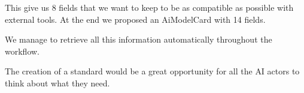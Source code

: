 This give us 8 fields that we want to keep to be as compatible as possible with
external tools. At the end we proposed an \Gls{AiModelCard} with 14 fields.


We manage to retrieve all this information automatically throughout the workflow.

The creation of a standard
would be a great opportunity for all the \Gls{AI} actors to think about what they
need.


%
%
%



